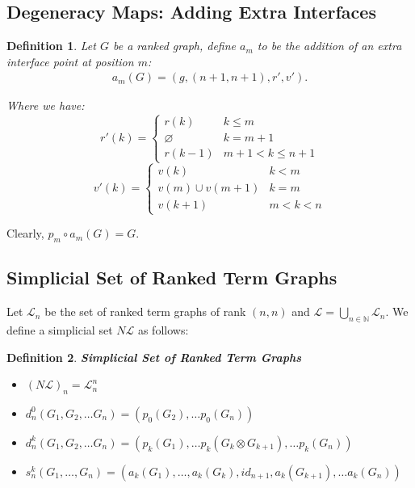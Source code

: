 \documentclass[12pt]{article}
\newtheorem{definition}{Definition}
\newcommand{\1}{\mathbbm{1}}
\begin{document}
\subsection{Degeneracy Maps: Adding Extra Interfaces}
\begin{definition}
    Let $G$ be a ranked graph, define $a_m$ to be the addition of an extra interface point at position $m$:
        \begin{align*}
        a_m(G) = (g, (n+1, n+1), r', v').
    \end{align*}

    Where we have:
    \[
    r'(k) = \begin{cases}
        r(k) & k \leq m\\
        \varnothing & k = m+1\\
        r(k - 1) & m + 1 < k \leq n+1
    \end{cases}
    \]
        \[
    v'(k) = \begin{cases}
        v(k) & k < m\\
        v(m) \cup v(m+1) & k = m\\
        v(k + 1) & m < k < n
    \end{cases}
    \]
\end{definition}

Clearly, $p_m\circ a_m (G) = G$.

\subsection{Simplicial Set of Ranked Term Graphs}
Let $\mathcal{L}_n$ be the set of ranked term graphs of rank $(n,n)$ and $\mathcal{L} = \bigcup_{n\in\mathbb{N}} \mathcal{L}_n$. We define a simplicial set $N\mathcal{L}$ as follows:
\begin{definition}
\textbf{Simplicial Set of Ranked Term Graphs}
    \begin{itemize}
        \item $(N\mathcal{L})_n = \mathcal{L}_n^n$
        \item $d_n^0(G_1, G_2, \dots G_n) = (p_0(G_2), \dots p_0(G_n))$
        \item $d_n^k(G_1, G_2, \dots G_n) = (p_k(G_1), \dots p_k(G_k \otimes G_{k+1}), \dots p_k(G_n))$
        \item $s_n^k(G_1, \dots, G_n) = (a_k(G_1), \dots, a_k(G_k), id_{n+1}, a_k(G_{k+1}), \dots a_k(G_n))$
    \end{itemize}
\end{definition}
\end{document}
